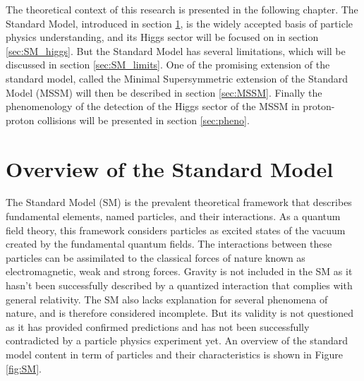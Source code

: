 




The theoretical context of this research is presented in the following chapter. The Standard Model, introduced in section \ref{sec:SM}, is the widely accepted basis of particle physics understanding, and its Higgs sector will be focused on in section \ref{sec:SM_higgs}. But the Standard Model has several limitations, which will be discussed in section \ref{sec:SM_limits}. One of the promising extension of the standard model, called the Minimal Supersymmetric extension of the Standard Model (MSSM) will then be described in section \ref{sec:MSSM}. Finally the phenomenology of the detection of the Higgs sector of the MSSM in proton-proton collisions will be presented in section \ref{sec:pheno}.

\section{Overview of the Standard Model}
\label{sec:SM}
The Standard Model (SM) is the prevalent theoretical framework that describes fundamental elements, named particles, and their interactions. As a quantum field theory, this framework considers particles as excited states of the vacuum created by the fundamental quantum fields. The interactions between these particles can be assimilated to the classical forces of nature known as electromagnetic, weak and strong forces. Gravity is not included in the SM as it hasn't been successfully described by a quantized interaction that complies with general relativity. The SM also lacks explanation for several phenomena of nature, and is therefore considered incomplete. But its validity is not questioned as it has provided confirmed predictions and has not been successfully contradicted by a particle physics experiment yet. An overview of the standard model content in term of particles and their characteristics is shown in Figure \ref{fig:SM}.\newline

